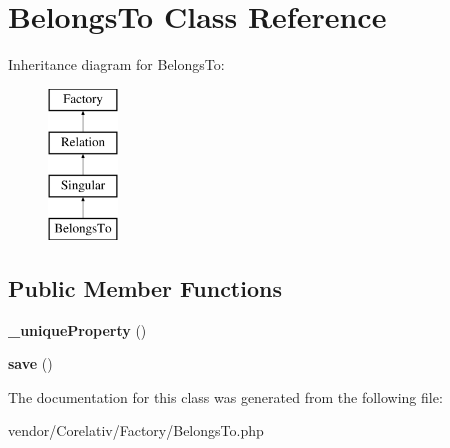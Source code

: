 \hypertarget{classBelongsTo}{
\section{BelongsTo Class Reference}
\label{classBelongsTo}
}
Inheritance diagram for BelongsTo:\begin{figure}[H]
\begin{center}
\leavevmode
\includegraphics[height=4.000000cm]{classBelongsTo}
\end{center}
\end{figure}
\subsection*{Public Member Functions}
\begin{DoxyCompactItemize}
\item 
\hypertarget{classBelongsTo_ae17b1381580943d382027f0c6f3df9a9}{
{\bfseries \_\-uniqueProperty} ()}
\label{classBelongsTo_ae17b1381580943d382027f0c6f3df9a9}

\item 
\hypertarget{classBelongsTo_a8652f2b080d08e32207ff61559255b45}{
{\bfseries save} ()}
\label{classBelongsTo_a8652f2b080d08e32207ff61559255b45}

\end{DoxyCompactItemize}


The documentation for this class was generated from the following file:\begin{DoxyCompactItemize}
\item 
vendor/Corelativ/Factory/BelongsTo.php\end{DoxyCompactItemize}
